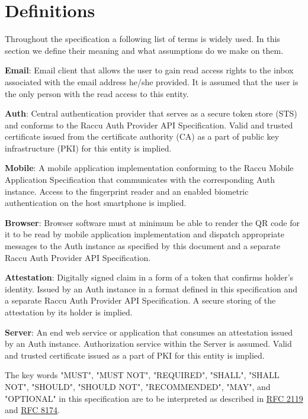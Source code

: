 \section{Definitions}
Throughout the specification a following list of terms is widely used. In this section we define their meaning 
and what assumptions do we make on them.

\medskip
\textbf{Email}: Email client that allows the user to gain read access rights to the inbox associated
with the email address he/she provided. It is assumed that the user is the only person with the read access 
to this entity.

\medskip
\textbf{Auth}: Central authentication provider that serves as a secure token store (STS) and conforms to 
the Raccu Auth Provider API Specification. Valid and trusted certificate issued from the certificate authority (CA)
as a part of public key infrastructure (PKI) for this entity is implied.

\medskip
\textbf{Mobile}: A mobile application implementation conforming to the Raccu Mobile Application Specification 
that communicates with the corresponding Auth instance. Access to the fingerprint reader and an enabled biometric 
authentication on the host smartphone is implied.

\medskip
\textbf{Browser}: Browser software must at minimum be able to render the QR code for it to be read by mobile 
application implementation and dispatch appropriate messages to the Auth instance as specified by this document 
and a separate Raccu Auth Provider API Specification. 

\medskip
\textbf{Attestation}: Digitally signed claim in a form of a token that confirms holder's identity. Issued by 
an Auth instance in a format defined in this specification and a separate Raccu Auth Provider API Specification. 
A secure storing of the attestation by its holder is implied.

\medskip
\textbf{Server}: An end web service or application that consumes an attestation issued by an Auth instance. 
Authorization service within the Server is assumed. Valid and trusted certificate issued as a part of PKI 
for this entity is implied.

\medskip
The key words "MUST", "MUST NOT", "REQUIRED", "SHALL", "SHALL NOT", "SHOULD", "SHOULD NOT", "RECOMMENDED", 
"MAY", and "OPTIONAL" in this specification are to be interpreted as described in 
\href{https://tools.ietf.org/html/rfc2119}{RFC 2119} and \href{https://tools.ietf.org/html/rfc8174}{RFC 8174}.
